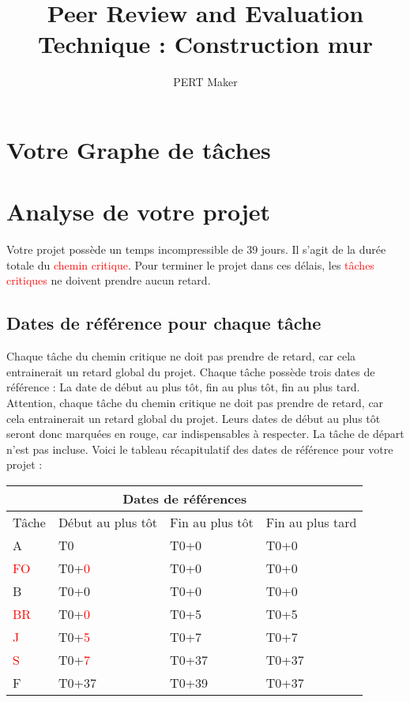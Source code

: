 \documentclass{article}
\title{\centering Peer Review and Evaluation Technique : Construction mur
}
\author{PERT Maker}
\begin{document}
\maketitle
\tableofcontents{}
\section{Votre Graphe de tâches}
\begin{center}
\end{center}
\section{Analyse de votre projet}
Votre projet possède un temps incompressible de 39 jours.
    Il s'agit de la durée totale du \textcolor{red}{chemin critique}.
    Pour terminer le projet dans ces délais, les \textcolor{red}{tâches critiques} ne doivent prendre aucun retard.\subsection{Dates de référence pour chaque tâche}Chaque tâche du chemin critique ne doit pas prendre de
    retard, car cela entrainerait un retard global du projet. 
    Chaque tâche possède trois dates de référence : La date de début au plus tôt,
    fin au plus tôt, fin au plus tard.
    Attention, chaque tâche du chemin critique ne doit pas prendre de
    retard, car cela entrainerait un retard global du projet.
    Leurs dates de début au plus tôt seront donc marquées en rouge,
    car indispensables à respecter. La tâche de départ n'est pas incluse. \newpage
    Voici le tableau récapitulatif des dates de référence pour votre projet :\newline 
\begin{tabular}{ |p{3cm}||p{3cm}|p{3cm}|p{3cm}|  }
        \hline
        \multicolumn{4}{|c|}{Dates de références} \\
        \hline 
        Tâche&Début au plus tôt&Fin au plus tôt&Fin au plus tard \\ 
        \hline 
A&T0&T0+0&T0+0 \\ 
\textcolor{red}{FO}&T0+\textcolor{red}{0}&T0+0&T0+0 \\ 
B&T0+0&T0+0&T0+0 \\ 
\textcolor{red}{BR}&T0+\textcolor{red}{0}&T0+5&T0+5 \\ 
\textcolor{red}{J}&T0+\textcolor{red}{5}&T0+7&T0+7 \\ 
\textcolor{red}{S}&T0+\textcolor{red}{7}&T0+37&T0+37 \\ 
F&T0+37&T0+39&T0+37 \\ 
\hline
    \end{tabular} 
\end{document}
